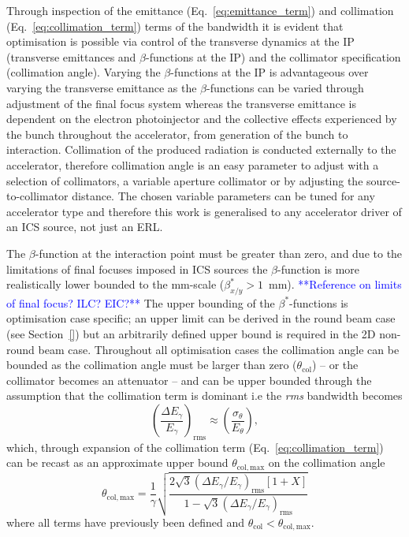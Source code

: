 \documentclass[../main.tex]{subfiles}
\begin{document}
Through inspection of the emittance (Eq.~\ref{eq:emittance_term}) and collimation (Eq.~\ref{eq:collimation_term}) terms of the bandwidth it is evident that optimisation is possible via control of the transverse dynamics at the IP (transverse emittances and $\beta$-functions at the IP) and the collimator specification (collimation angle). Varying the $\beta$-functions at the IP is advantageous over varying the transverse emittance as the $\beta$-functions can be varied through adjustment of the final focus system whereas the transverse emittance is dependent on the electron photoinjector and the collective effects experienced by the bunch throughout the accelerator, from generation of the bunch to interaction. Collimation of the produced radiation is conducted externally to the accelerator, therefore collimation angle is an easy parameter to adjust with a selection of collimators, a variable aperture collimator or by adjusting the source-to-collimator distance. The chosen variable parameters can be tuned for any accelerator type and therefore this work is generalised to any accelerator driver of an ICS source, not just an ERL.

The $\beta$-function at the interaction point must be greater than zero, and due to the limitations of final focuses imposed in ICS sources the $\beta$-function is more realistically lower bounded to the \si{\milli\meter}-scale ($\beta_{x/y}^{*} > 1$~\si{\milli\meter}). \textcolor{blue}{**Reference on limits of final focus? ILC? EIC?**} The upper bounding of the $\beta^{*}$-functions is optimisation case specific; an upper limit can be derived in the round beam case (see Section~\ref{}) but an arbitrarily defined upper bound is required in the 2D non-round beam case. Throughout all optimisation cases the collimation angle can be bounded as the collimation angle must be larger than zero ($\theta_{\mathrm{col}}$) -- or the collimator becomes an attenuator -- and can be upper bounded through the assumption that the collimation term is dominant i.e the \textit{rms} bandwidth becomes
\begin{equation}
\left(\frac{\Delta E_{\gamma}}{E_{\gamma}}\right)_{\mathrm{rms}} \approx \left(\frac{\sigma_{\theta}}{E_{\theta}}\right),    
\label{eq:collimation_dominant}
\end{equation}
which, through expansion of the collimation term (Eq.~\ref{eq:collimation_term}) can be recast as an approximate upper bound $\theta_{\mathrm{col},\mathrm{max}}$ on the collimation angle 
\begin{equation}
\theta_{\mathrm{col},\mathrm{max}} = \frac{1}{\gamma}\sqrt{\frac{2\sqrt{3}\left(\Delta E_{\gamma}/E_{\gamma}\right)_{\mathrm{rms}}\left[1+X\right]}{1-\sqrt{3}\left(\Delta E_{\gamma}/E_{\gamma}\right)_{\mathrm{rms}}}}
\label{eq:collimation_angle_upper_bound}    
\end{equation}
where all terms have previously been defined and $\theta_{\mathrm{col}}<\theta_{\mathrm{col},\mathrm{max}}$.
\end{document}
